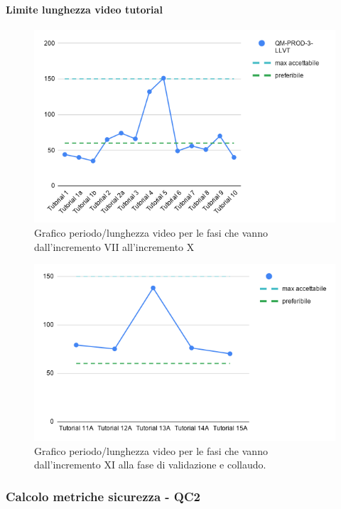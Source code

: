 \paragraph{Limite lunghezza video tutorial}
\begin{figure}[H]
			\centering
			\includegraphics[width=0.8\linewidth]{./res/images/LLVT.png}
			\caption{Grafico periodo/lunghezza video per le fasi che vanno dall'incremento VII all'incremento X}
			\label{fig:Grafico periodo/lunghezza video per le fasi che vanno dall'incremento VII all'incremento X}
	\end{figure}
	\begin{figure}[H]
			\centering
			\includegraphics[width=0.8\linewidth]{./res/images/LLVT_1.png}
			\caption{Grafico periodo/lunghezza video per le fasi che vanno dall'incremento XI alla fase di validazione e collaudo.}
			\label{fig:Grafico periodo/lunghezza video per le fasi che vanno dall'incremento XI alla fase di validazione e collaudo.}
	\end{figure}

\subsubsection{Calcolo metriche sicurezza - QC2}
